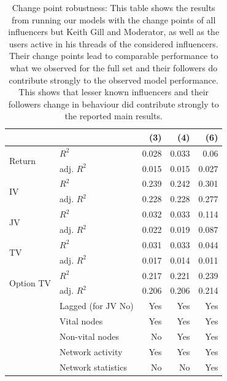 \begin{table}[ht]
\centering
\caption{Change point robustness: This table shows the results from running our models with the 
                    change points of all influencers but Keith Gill and Moderator, as well as the users active in his threads of the considered influencers. 
                    Their change points lead to comparable performance to what we observed for the full set and their followers do contribute strongly to the observed 
                    model performance. This shows that lesser known influencers and their followers change in behaviour did contribute strongly to the reported main results.} 
\label{table_r2_robust_rest}
\begingroup\scriptsize
\begin{tabular}{ll|rrr}
  \hline
\hline
  &   & (3) & (4) & (6) \\ 
  \hline
\multirow{2}{*}{Return} & $R^2$ & 0.028 & 0.033 & 0.06 \\ 
    & adj. $R^2$ & 0.015 & 0.015 & 0.027 \\ 
   \hline
\multirow{2}{*}{IV} & $R^2$ & 0.239 & 0.242 & 0.301 \\ 
    & adj. $R^2$ & 0.228 & 0.228 & 0.277 \\ 
   \hline
\multirow{2}{*}{JV} & $R^2$ & 0.032 & 0.033 & 0.114 \\ 
    & adj. $R^2$ & 0.022 & 0.019 & 0.087 \\ 
   \hline
\multirow{2}{*}{TV} & $R^2$ & 0.031 & 0.033 & 0.044 \\ 
    & adj. $R^2$ & 0.017 & 0.014 & 0.011 \\ 
   \hline
\multirow{2}{*}{Option TV} & $R^2$ & 0.217 & 0.221 & 0.239 \\ 
    & adj. $R^2$ & 0.206 & 0.206 & 0.214 \\ 
   \hline & Lagged (for JV No) & Yes & Yes & Yes \\ & Vital nodes & Yes & Yes & Yes \\ & Non-vital nodes & No & Yes & Yes \\ & Network activity & Yes & Yes & Yes \\ & Network statistics & No & No & Yes \\ \hline
\hline
\hline
\end{tabular}
\endgroup
\end{table}
